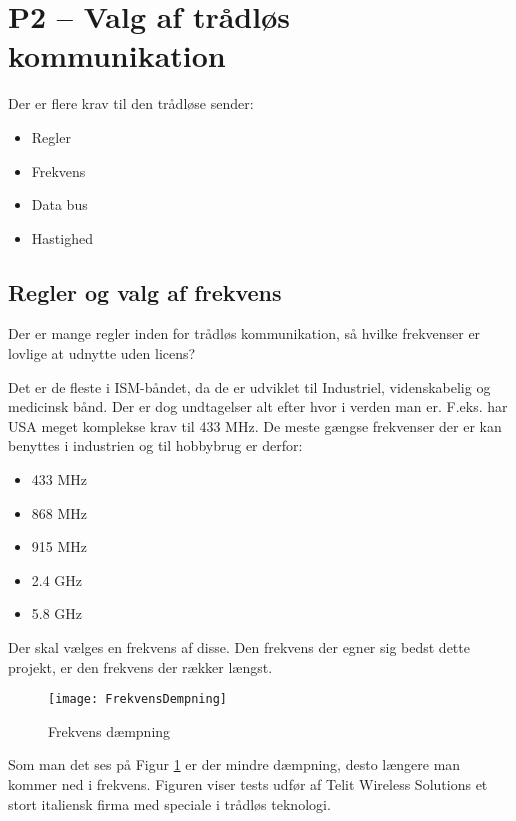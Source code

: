 \documentclass[Main]{subfiles}
\begin{document}
\section[Valg af trådløs kommunikation]{P2 -- Valg af trådløs kommunikation}

Der er flere krav til den trådløse sender:
\vspace{-20pt}
\begin{itemize}
\item Regler
\item Frekvens
\item Data bus
\item Hastighed
\end{itemize}

\subsection{Regler og valg af frekvens}
Der er mange regler inden for trådløs kommunikation, så hvilke frekvenser er lovlige at udnytte uden licens?

Det er de fleste i ISM-båndet, da de er udviklet til  Industriel, videnskabelig og medicinsk bånd. 
Der er dog undtagelser alt efter hvor i verden man er.
F.eks. har USA meget komplekse krav til 433 MHz\cite{Lov1}.
De meste gængse frekvenser der er kan benyttes i industrien og til hobbybrug er derfor:

\vspace{-20pt}
\begin{itemize}
\item 433 MHz
\item 868 MHz
\item 915 MHz
\item 2.4 GHz
\item 5.8 GHz
\end{itemize}

Der skal vælges en frekvens af disse.
Den frekvens der egner sig bedst dette projekt, er den frekvens der rækker længst. 

\begin{figure}[H]
\centering
\texttt{[image: FrekvensDempning]}
\caption{Frekvens dæmpning}
\label{Fig:dempning}
\end{figure}


Som man det ses på Figur \ref{Fig:dempning} er der mindre dæmpning, desto længere man kommer ned i frekvens. Figuren viser tests udfør af Telit Wireless Solutions\cite{Telit} et stort italiensk firma med speciale i trådløs teknologi.
\end{document}
